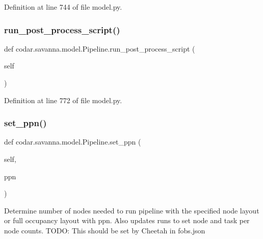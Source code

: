 Definition at line 744 of file model.\+py.

\mbox{\label{classcodar_1_1savanna_1_1model_1_1_pipeline_a9a21933f3cc3457a161029b4f708997b}} 
\subsubsection{\texorpdfstring{run\+\_\+post\+\_\+process\+\_\+script()}{run\_post\_process\_script()}}
{\footnotesize\ttfamily def codar.\+savanna.\+model.\+Pipeline.\+run\+\_\+post\+\_\+process\+\_\+script (\begin{DoxyParamCaption}\item[{}]{self }\end{DoxyParamCaption})}



Definition at line 772 of file model.\+py.

\mbox{\label{classcodar_1_1savanna_1_1model_1_1_pipeline_a559b6f3f07dc06fd1c42a33fff9e96f1}} 
\subsubsection{\texorpdfstring{set\+\_\+ppn()}{set\_ppn()}}
{\footnotesize\ttfamily def codar.\+savanna.\+model.\+Pipeline.\+set\+\_\+ppn (\begin{DoxyParamCaption}\item[{}]{self,  }\item[{}]{ppn }\end{DoxyParamCaption})}

\begin{DoxyVerb}Determine number of nodes needed to run pipeline with the specified
node layout or full occupancy layout with ppn. Also updates runs
to set node and task per node counts.
TODO: This should be set by Cheetah in fobs.json\end{DoxyVerb}
 

